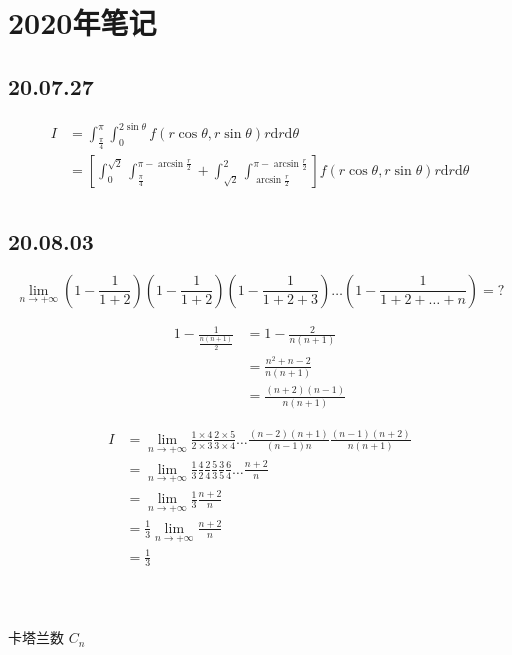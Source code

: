 \documentclass[10pt,a4paper]{book}
\begin{document}
	\chapter{2020年笔记}
	\section{20.07.27}
	\begin{equation}
		\begin{aligned}
			I &= \int_{\frac{\pi}{4}}^{\pi}\int_{0}^{2\sin\theta} f(r\cos\theta,r\sin\theta)r\text{d}r\text{d}\theta\\	
			&=[\int_{0}^{\sqrt{2}}\int_{\frac{\pi}{4}}^{\pi-\arcsin\frac{r}{2}} 
			+ \int_{\sqrt{2}}^{2} \int_{\arcsin\frac{r}{2}}^{\pi-\arcsin\frac{r}{2}}  ]
			f(r\cos\theta,r\sin\theta)r\text{d}r\text{d}\theta\\
		\end{aligned}
	\end{equation}
	
	\section{20.08.03}
	
	\begin{equation}
		\lim\limits_{n \rightarrow +\infty }
	(1-\frac{1}{1+2})(1-\frac{1}{1+2}) (1-\frac{1}{1+2+3})\dots(1-\frac{1}{1+2+\dots+n}) = ?
	\end{equation}

	\begin{equation}
		\begin{aligned}
			1-\frac{1}{\frac{n(n+1)}{2}} &= 1-\frac{2}{n(n+1)}\\
			&=\frac{n^2+n-2}{n(n+1)}\\
			&=\frac{(n+2)(n-1)}{n(n+1)}
		\end{aligned}
	\end{equation}
	
	\begin{equation}
		\begin{aligned}
			I&=\lim\limits_{n\rightarrow +\infty}\frac{1\times 4}{2\times 3}\frac{2\times 5}{3\times 4}\dots \frac{(n-2)(n+1)}{(n-1)n}\frac{(n-1)(n+2)}{n(n+1)}\\
			&=\lim\limits_{n\rightarrow+\infty}\frac{1}{3}\frac{4}{2}\frac{2}{4}\frac{5}{3}\frac{3}{5}\frac{6}{4}\dots \frac{n+2}{n}\\
			&=\lim\limits_{n\rightarrow+\infty}\frac{1}{3}\frac{n+2}{n}\\
			&=\frac{1}{3}\lim\limits_{n \rightarrow +\infty }\frac{n+2}{n}\\
			&=\frac{1}{3}
		\end{aligned}
	\end{equation}
	\\
	\\
	\\
	卡塔兰数 $ C_n $
	
\end{document}
